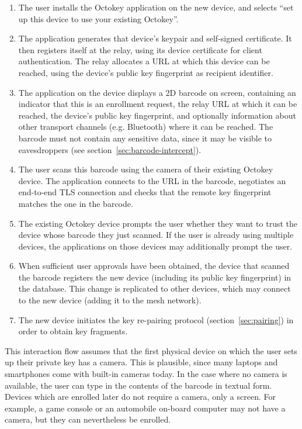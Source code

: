 \begin{enumerate}
\item The user installs the Octokey application on the new device, and selects ``set up this device
to use your existing Octokey''.
\item The application generates that device's keypair and self-signed certificate. It then registers
itself at the relay, using its device certificate for client authentication. The relay allocates a
URL at which this device can be reached, using the device's public key fingerprint as recipient
identifier.
\item The application on the device displays a 2D barcode on screen, containing an indicator that
this is an enrollment request, the relay URL at which it can be reached, the device's public key
fingerprint, and optionally information about other transport channels (e.g. Bluetooth) where it can
be reached. The barcode must not contain any sensitive data, since it may be visible to
eavesdroppers (see section~\ref{sec:barcode-intercept}).
\item The user scans this barcode using the camera of their existing Octokey device. The application
connects to the URL in the barcode, negotiates an end-to-end TLS connection and checks that the
remote key fingerprint matches the one in the barcode.
\item The existing Octokey device prompts the user whether they want to trust the device whose
barcode they just scanned. If the user is already using multiple devices, the applications on those
devices may additionally prompt the user.
\item When sufficient user approvals have been obtained, the device that scanned the barcode
registers the new device (including its public key fingerprint) in the database. This change is
replicated to other devices, which may connect to the new device (adding it to the mesh network).
\item The new device initiates the key re-pairing protocol (section~\ref{sec:pairing}) in order to
obtain key fragments.
\end{enumerate}

This interaction flow assumes that the first physical device on which the user sets up their private
key has a camera. This is plausible, since many laptops and smartphones come with built-in cameras
today. In the case where no camera is available, the user can type in the contents of the barcode in
textual form. Devices which are enrolled later do not require a camera, only a screen. For example,
a game console or an automobile on-board computer may not have a camera, but they can nevertheless
be enrolled.

